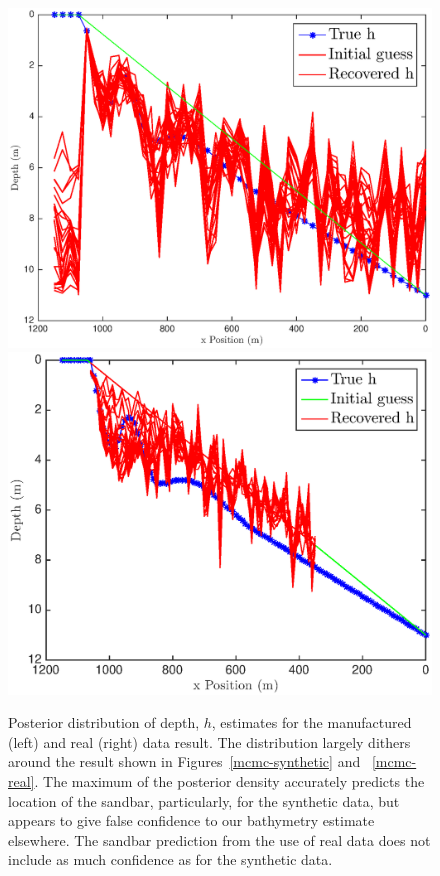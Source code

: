 \begin{figure}[H]
\center
\includegraphics[scale=0.46]{img/MCMC-posterior-manufactured}
\includegraphics[scale=0.46]{img/MCMC-posterior-real}
\caption{Posterior distribution of depth, $h$, estimates for the manufactured (left) and real (right) data result. The distribution largely dithers around the result shown in Figures~\ref{mcmc-synthetic} and ~\ref{mcmc-real}. The maximum of the posterior density accurately predicts the location of the sandbar, particularly, for the synthetic data, but appears to give false confidence to our bathymetry estimate elsewhere. The sandbar prediction from the use of real data does not include as much confidence as for the synthetic data.}
\label{mcmc-posterior}
\end{figure}


